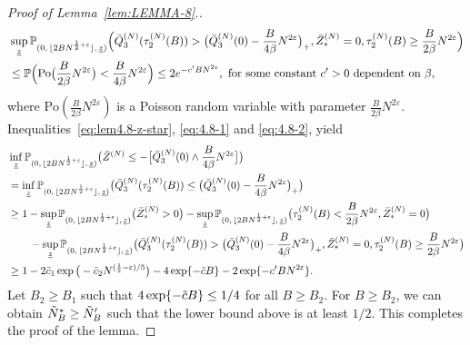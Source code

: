 \documentclass[11pt, reqno]{article}
\numberwithin{equation}{section}
\numberwithin{theorem}{section}
\begin{document}
\begin{proof}[Proof of Lemma~\ref{lem:LEMMA-8}.]
    \begin{align}\label{eq:4.8-2}
        &\sup_{\underline{z}}\mathbb{P}_{(0, \, \lfloor 2BN^{\frac{1}{2}+\varepsilon} \rfloor, \,\underline{z})}\Big(\Bar{Q}^{(N)}_3(\tau^{(N)}_2(B))>\big(\Bar{Q}^{(N)}_3(0)-\frac{B}{4\beta}N^{2\varepsilon}\big)_+, \Bar{Z}^{(N)}_{*}=0,\tau^{(N)}_2(B)\geq \frac{B}{2\beta}N^{2\varepsilon}\Big)\nonumber\\
        &\leq  \mathbb{P}\Big(\mathrm{Po}\big(\frac{B}{2\beta}N^{2\varepsilon}\big)<\frac{B}{4\beta}N^{2\varepsilon}\Big)\leq 2e^{-c'B N^{2\varepsilon}}, \text{ for some constant }c'>0\text{ dependent on }\beta,
    \end{align}
    where $\mathrm{Po}(\frac{B}{2\beta}N^{2\varepsilon})$ is a Poisson random variable with parameter $\frac{B}{2\beta}N^{2\varepsilon}$. 
    Inequalities~\eqref{eq:lem4.8-z-star}, \eqref{eq:4.8-1} and \eqref{eq:4.8-2}, yield
    \begin{align*}
        &\inf_{\underline{z}} \mathbb{P}_{(0, \, \lfloor 2BN^{\frac{1}{2}+\varepsilon} \rfloor, \,\underline{z})}\big(\Bar{Z}^{(N)}\leq -\big[\Bar{Q}^{(N)}_3(0) \wedge \frac{B}{4\beta}N^{2\varepsilon}\big]\big)\\
        &=\inf_{\underline{z}} \mathbb{P}_{(0, \, \lfloor 2BN^{\frac{1}{2}+\varepsilon} \rfloor, \,\underline{z})}\big(\Bar{Q}^{(N)}_3(\tau^{(N)}_2(B)) \le \big(\Bar{Q}^{(N)}_3(0)-\frac{B}{4\beta}N^{2\varepsilon}\big)_+\big)\\
        &\geq  1-\sup_{\underline{z}}\mathbb{P}_{(0, \, \lfloor 2BN^{\frac{1}{2}+\varepsilon} \rfloor, \,\underline{z})}\big(\Bar{Z}^{(N)}_{*}>0\big)-\sup_{\underline{z}}\mathbb{P}_{(0, \, \lfloor 2BN^{\frac{1}{2}+\varepsilon} \rfloor, \,\underline{z})}\big(\tau^{(N)}_2(B)<\frac{B}{2\beta}N^{2\varepsilon},\Bar{Z}^{(N)}_{*}=0\big)\\
        &\qquad-\sup_{\underline{z}}\mathbb{P}_{(0, \, \lfloor 2BN^{\frac{1}{2}+\varepsilon} \rfloor, \,\underline{z})}\big(\Bar{Q}^{(N)}_3(\tau^{(N)}_2(B))>\big(\Bar{Q}^{(N)}_3(0)-\frac{B}{4\beta}N^{2\varepsilon}\big)_+, \Bar{Z}^{(N)}_{*}=0,\tau^{(N)}_2(B)\geq \frac{B}{2\beta}N^{2\varepsilon}\big)\\
        &\ge 1 - 2\bar{c}_1 \exp\big(-\bar{c}_2N^{(\frac{1}{2}-\varepsilon)/5}\big) - 4\exp \{-\Tilde{c}B\} - 2\exp\{-c'B N^{2\varepsilon}\}.
    \end{align*}
Let $B_2 \ge B_1$ such that $4\exp \{-\Tilde{c}B\} \le 1/4$ for all $B \ge B_2$. For $B \ge B_2$, we can obtain $\tilde N^*_B \ge \Tilde{N}'_B$ such that  the lower bound above is at least $1/2$. This completes the proof of the lemma.
\end{proof}
\end{document}
